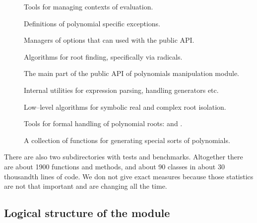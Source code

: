 \begin{description}
\item[] \leavevmode
Tools for managing contexts of evaluation.

\item[] \leavevmode
Definitions of polynomial specific exceptions.

\item[] \leavevmode
Managers of options that can used with the public API.

\item[] \leavevmode
Algorithms for root finding, specifically via radicals.

\item[] \leavevmode
The main part of the public API of polynomials manipulation module.

\item[] \leavevmode
Internal utilities for expression parsing, handling generators etc.

\item[] \leavevmode
Low--level algorithms for symbolic real and complex root isolation.

\item[] \leavevmode
Tools for formal handling of polynomial roots:  and .

\item[] \leavevmode
A collection of functions for generating special sorts of polynomials.

\end{description}

There are also two subdirectories with tests and benchmarks. Altogether there are about 1900
functions and methods, and about 90 classes in about 30 thousandth lines of code. We don not
give exact measures because those statistics are not that important and are changing all the
time.


\subsection{Logical structure of the module}

